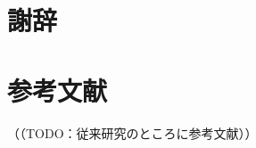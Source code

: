 \documentclass[uplatex,dvipdfmx,a4paper,twocolumn,base=11pt,jbase=11pt,ja=standard]{bxjsarticle}  %
\begin{document}
\section*{謝辞}


\section*{参考文献}



（（TODO：従来研究のところに参考文献））










\end{document}
